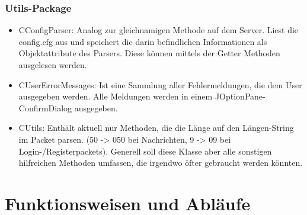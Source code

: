 \documentclass[a4paper,12pt]{scrartcl}
\begin{document}
\subsubsection{Utils-Package}
\begin{itemize}
\item CConfigParser: Analog zur gleichnamigen Methode auf dem Server. Liest die config.cfg aus und speichert die darin befindlichen Informationen als Objektattribute des Parsers. Diese können mittels der Getter Methoden ausgelesen werden.
\item CUserErrorMessages: Ist eine Sammlung aller Fehlermeldungen, die dem User ausgegeben werden. Alle Meldungen werden in einem JOptionPane-ConfirmDialog ausgegeben.
\item CUtils: Enthält aktuell nur Methoden, die die Länge auf den Längen-String im Packet parsen. (50 -> 050 bei Nachrichten, 9 -> 09 bei Login-/Registerpackets). Generell soll diese Klasse aber alle sonstigen hilfreichen Methoden umfassen, die irgendwo öfter gebraucht werden könnten.
\end{itemize}
\clearpage

\section{Funktionsweisen und Abläufe}
\end{document}
